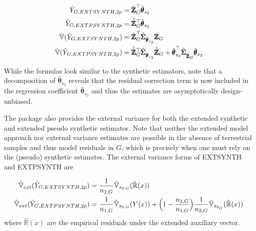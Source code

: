 \begin{subequations}\label{eq:pest_2p_extsynth_extpsynth}
\begin{align}
\hat{Y}_{G,EXTSYNTH,2p} & = \bar{\pmb{\mathbb{Z}}}^{\top}_{G}\hat{\pmb{\theta}}_{s_2} \label{eq:pointest_2p_extsynth} \\
\hat{Y}_{G,EXTPSYNTH,2p} & =\hat{\bar{\pmb{\mathbb{Z}}}}_{G}^{\top}\hat{\pmb{\theta}}_{s_2} \label{eq:pointest_2p_extsynth} \\
\hat{\mathbb{V}}(\hat{Y}_{G,EXTSYNTH,2p}) & = \bar{\pmb{\mathbb{Z}}}^{\top}_{G}\hat{\pmb{\Sigma}}_{\hat{\pmb{\theta}}_{s_2}}\bar{\pmb{\mathbb{Z}}}_{G} \label{eq:var_2p_extsynth} \\
\hat{\mathbb{V}}(\hat{Y}_{G,EXTPSYNTH,2p})& =
\hat{\bar{\pmb{\mathbb{Z}}}}_{G}^{\top}\hat{\pmb{\Sigma}}_{\hat{\pmb{\theta}}_{s_2}}
\hat{\bar{\pmb{\mathbb{Z}}}}_{G}
+ \hat{\pmb{\theta}}^{\top}_{s_2}\hat{\pmb{\Sigma}}_{\hat{\bar{\pmb{\mathbb{Z}}}}_{G}}\hat{\pmb{\theta}}_{s_2} \label{eq:var_2p_extpsynth}
\end{align}
\end{subequations}

While the formulas look similar to the synthetic estimators, note that a decomposition of $\hat{\pmb{\theta}}_{s_2}$ reveals that the residual correction term is now included in the regression coefficient $\hat{\pmb{\theta}}_{s_2}$ \citep{mandallaz2016} and thus the estimates are asymptotically design-unbiased.

The package also provides the external variance for both the extended synthetic and extended pseudo synthetic estimator. Note that neither the extended model approach nor external variance estimates are possible in the absence of terrestrial samples and thus model residuals in $G$, which is precisely when one must rely on the (pseudo) synthetic estimates. The external variance forms of EXTSYNTH and EXTPSYNTH are

\begin{subequations}\label{eq:ext_varexternal_2p_extsynth}
\begin{align}
  \hat{\mathbb{V}}_{ext}(\hat{Y}_{G,EXTSYNTH,2p}) & = \frac{1}{n_{2,G}}\hat{\mathbb{V}}_{s_{2,G}}(\hat{\mathbb{R}}(x)) \label{eq:ext_varexternal_2p_extsynth} \\
  \hat{\mathbb{V}}_{ext}(\hat{Y}_{G,EXTPSYNTH,2p}) & = \frac{1}{n_{1,G}}\hat{\mathbb{V}}_{s_{2,G}}(Y(x)) + \Big(1-\frac{n_{2,G}}{n_{1,G}}\Big)\frac{1}{n_{2,G}}\hat{\mathbb{V}}_{s_{2_G}}(\hat{\mathbb{R}}(x)) \label{eq:ext_varexternal_2p_extpsynth}
\end{align}
\end{subequations}
where $\hat{\mathbb{R}}(x)$ are the empirical residuals under the extended auxiliary vector.

